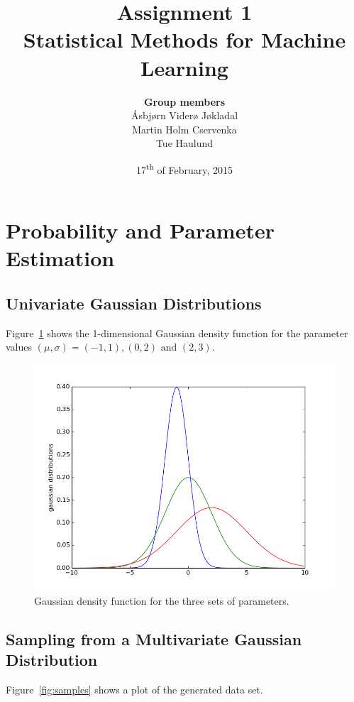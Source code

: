 \documentclass[a4paper]{article}
\title{\textbf{Assignment 1} \\ \small Statistical Methods for Machine Learning }
\author{\textbf{Group members}\\
        Ásbjørn Viderø Jøkladal\\
        Martin Holm Cservenka\\
        Tue Haulund}
\date{17\textsuperscript{th} of February, 2015}
\begin{document}
\maketitle
\tableofcontents
\newpage

\section{Probability and Parameter Estimation}
\subsection{Univariate Gaussian Distributions}
Figure~\ref{fig:distributions} shows the 1-dimensional Gaussian density function for the parameter values $(\mu, \sigma) = (-1, 1), (0, 2) \text{ and } (2, 3)$.

\begin{figure}[ht]
  \centering
  \includegraphics[width=.8\linewidth]{figures/distributions.png}
  \caption{Gaussian density function for the three sets of parameters.}
  \label{fig:distributions}
\end{figure}

\subsection{Sampling from a Multivariate Gaussian Distribution}
Figure~\ref{fig:samples} shows a plot of the generated data set.
\end{document}
